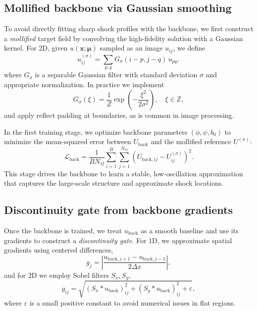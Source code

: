 \documentclass[a4paper,fleqn]{cas-dc}
\begin{document}
\subsection{Mollified backbone via Gaussian smoothing}

To avoid directly fitting sharp shock profiles with the backbone, we first construct a \emph{mollified} target field by convolving the high-fidelity solution with a Gaussian kernel.
For 2D, given $u(\mathbf{x};\boldsymbol{\mu})$ sampled as an image $u_{ij}$, we define
\begin{equation}
  u^{(\sigma)}_{ij} = \sum_{p,q} G_\sigma(i-p,j-q)\, u_{pq},
\end{equation}
where $G_\sigma$ is a separable Gaussian filter with standard deviation $\sigma$ and appropriate normalization.
In practice we implement
\begin{equation}
  G_\sigma(\xi) = \frac{1}{Z}
    \exp\left(-\frac{\xi^2}{2\sigma^2}\right),\quad \xi\in\mathbb{Z},
\end{equation}
and apply reflect padding at boundaries, as is common in image processing.

In the first training stage, we optimize backbone parameters $(\phi,\psi,b_0)$ to minimize the mean-squared error between $U_{\mathrm{back}}$ and the mollified reference $U^{(\sigma)}$:
\begin{equation}
  \mathcal{L}_{\mathrm{back}}
  = \frac{1}{BN_\Omega} \sum_{i=1}^B \sum_{j=1}^{N_\Omega}
    \left( U_{\mathrm{back},ij} - U^{(\sigma)}_{ij} \right)^2.
  \label{eq:loss_backbone}
\end{equation}
This stage drives the backbone to learn a stable, low-oscillation approximation that captures the large-scale structure and approximate shock locations.

\subsection{Discontinuity gate from backbone gradients}

Once the backbone is trained, we treat $u_{\mathrm{back}}$ as a smooth baseline and use its gradients to construct a \emph{discontinuity gate}.
For 1D, we approximate spatial gradients using centered differences,
\begin{equation}
  g_j = \left|\frac{u_{\mathrm{back},j+1}-u_{\mathrm{back},j-1}}{2\Delta x}\right|,
\end{equation}
and for 2D we employ Sobel filters $S_x, S_y$,
\begin{equation}
  g_{ij} = \sqrt{ (S_x * u_{\mathrm{back}})_{ij}^2
                + (S_y * u_{\mathrm{back}})_{ij}^2 + \varepsilon },
\end{equation}
where $\varepsilon$ is a small positive constant to avoid numerical issues in flat regions.
\end{document}
